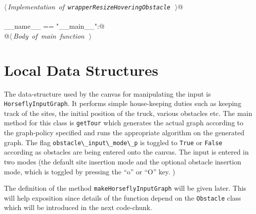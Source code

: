 \documentclass[11.5pt]{report}
\begin{document}
\begin{flushleft}
\begin{list}{}{}
\mbox{}\verb@@\hbox{$\langle\,${\itshape Implementation of \verb|wrapperResizeHoveringObstacle|}\nobreak\ {\footnotesize {}}$\,\rangle$}\verb@   @\\
\mbox{}\verb@@\\
\mbox{}\verb@if __name__ == "__main__":@\\
\mbox{}\verb@    @\hbox{$\langle\,${\itshape Body of main function}\nobreak\ {\footnotesize {}}$\,\rangle$}\verb@@\\
\mbox{}\verb@@{\NWsep}
\end{list}
\vspace{-1.5ex}
\footnotesize
\begin{list}{}{\setlength{\itemsep}{-\parsep}\setlength{\itemindent}{-\leftmargin}}

\item{}
\end{list}
\vspace{4ex}
\end{flushleft}


\section{Local Data Structures}

The data-structure used by the canvas for manipulating the input is \verb|HorseflyInputGraph|. It performs simple house-keeping duties such as keeping track of the 
sites, the initial position of the truck, various obstacles etc. The main method for this class is \verb|getTour| which generates the actual graph according to 
the graph-policy specified and runs the appropriate algorithm on the generated graph. The flag \verb|obstacle\_input\_mode\_p| is toggled to \verb|True| or 
\verb|False| according as obstacles are being entered onto the canvas. The input is entered in two modes (the default site insertion mode and the optional 
obstacle insertion mode, which is toggled by pressing the ``o'' or ``O'' key. )

The definition of the method \verb|makeHorseflyInputGraph| will be given later. This will help exposition since details of the function depend on the 
\verb|Obstacle| class which will be introduced in the next code-chunk.  
\end{document}
